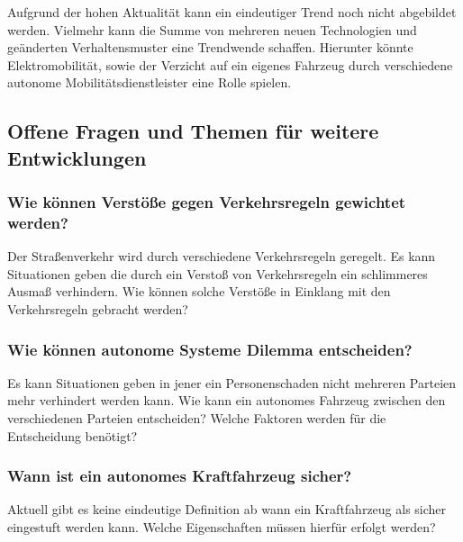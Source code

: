 Aufgrund der hohen Aktualität kann ein eindeutiger Trend noch nicht abgebildet werden.
Vielmehr kann die Summe von mehreren neuen Technologien und geänderten Verhaltensmuster eine Trendwende schaffen.
Hierunter könnte Elektromobilität, sowie der Verzicht auf ein eigenes Fahrzeug durch verschiedene
autonome Mobilitätsdienstleister eine Rolle spielen.

\subsection{Offene Fragen und Themen für weitere Entwicklungen}
\subsubsection{Wie können Verstöße gegen Verkehrsregeln gewichtet werden?}

Der Straßenverkehr wird durch verschiedene Verkehrsregeln geregelt.
Es kann Situationen geben die durch ein Verstoß von Verkehrsregeln ein
schlimmeres Ausmaß verhindern.
Wie können solche Verstöße in Einklang mit den Verkehrsregeln gebracht werden?

\subsubsection{Wie können autonome Systeme Dilemma entscheiden?}
Es kann Situationen geben in jener ein Personenschaden nicht mehreren Parteien mehr verhindert werden kann.
Wie kann ein autonomes Fahrzeug zwischen den verschiedenen Parteien entscheiden?
Welche Faktoren werden für die Entscheidung benötigt?

\subsubsection{Wann ist ein autonomes Kraftfahrzeug sicher?}
Aktuell gibt es keine eindeutige Definition ab wann ein Kraftfahrzeug als sicher eingestuft werden kann.
Welche Eigenschaften müssen hierfür erfolgt werden?